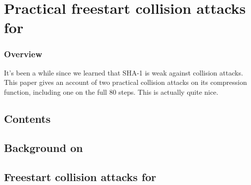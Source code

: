 \part[Collisions explicites pour la fonction de compression de \shaone]
    {Practical freestart collision attacks for \shaone} 
\label{part:sha-1}

\section*{Overview}
It's been a while since we learned that SHA-1 is weak against collision attacks. This paper gives an account of two practical collision attacks on its compression
function, including one on the full 80 steps. This is actually quite nice.


\cleardoublepage
\chapter*{Contents}
\parttoc



\chapter[Contexte sur \shaone]
        {Background on \shaone}
\label{cha:shaone_cont}







\chapter[Collisions à initialisation libres pour \shaone]
        {Freestart collision attacks for \shaone}
\label{cha:shaone_new}









\FloatBarrier




\FloatBarrier
